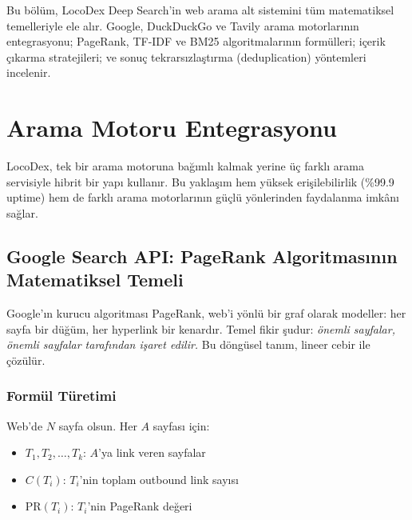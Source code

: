 
Bu b\"{o}l\"{u}m, LocoDex Deep Search'in web arama alt sistemini t\"{u}m matematiksel temelleriyle ele al{\i}r. Google, DuckDuckGo ve Tavily arama motorlar{\i}n{\i}n entegrasyonu; PageRank, TF-IDF ve BM25 algoritmalar{\i}n{\i}n form\"{u}lleri; i\c{c}erik \c{c}{\i}karma stratejileri; ve sonu\c{c} tekrars{\i}zla\c{s}t{\i}rma (deduplication) y\"{o}ntemleri incelenir.

\section{Arama Motoru Entegrasyonu}
\label{sec:arama-entegrasyon}

LocoDex, tek bir arama motoruna ba\u{g}{\i}ml{\i} kalmak yerine \"{u}\c{c} farkl{\i} arama servisiyle hibrit bir yap{\i} kullan{\i}r. Bu yakla\c{s}{\i}m hem y\"{u}ksek eri\c{s}ilebilirlik (\%99.9 uptime) hem de farkl{\i} arama motorlar{\i}n{\i}n g\"{u}\c{c}l\"{u} y\"{o}nlerinden faydalanma imk\^{a}n{\i} sa\u{g}lar.

\subsection{Google Search API: PageRank Algoritmas{\i}n{\i}n Matematiksel Temeli}
\label{subsec:pagerank}

Google'{\i}n kurucu algoritmas{\i} PageRank, web'i y\"{o}nl\"{u} bir graf olarak modeller: her sayfa bir d\"{u}\u{g}\"{u}m, her hyperlink bir kenard{\i}r. Temel fikir \c{s}udur: \textit{\"{o}nemli sayfalar, \"{o}nemli sayfalar taraf{\i}ndan i\c{s}aret edilir.} Bu d\"{o}ng\"{u}sel tan{\i}m, lineer cebir ile \c{c}\"{o}z\"{u}l\"{u}r.

\subsubsection{Form\"{u}l T\"{u}retimi}

Web'de $N$ sayfa olsun. Her $A$ sayfas{\i} i\c{c}in:
\begin{itemize}
  \item $T_1, T_2, \ldots, T_k$: $A$'ya link veren sayfalar
  \item $C(T_i)$: $T_i$'nin toplam outbound link say{\i}s{\i}
  \item $\text{PR}(T_i)$: $T_i$'nin PageRank de\u{g}eri
\end{itemize}

